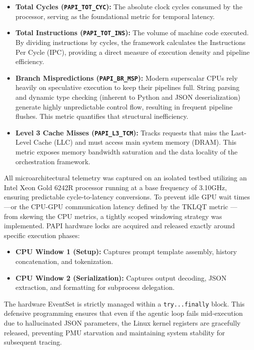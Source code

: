 \documentclass[10pt, letterpaper]{article}
\begin{document}
\begin{itemize}
\item \textbf{Total Cycles (\texttt{PAPI\_TOT\_CYC}):} The absolute clock cycles consumed by the processor, serving as the foundational metric for temporal latency.
\item \textbf{Total Instructions (\texttt{PAPI\_TOT\_INS}):} The volume of machine code executed. By dividing instructions by cycles, the framework calculates the Instructions Per Cycle (IPC), providing a direct measure of execution density and pipeline efficiency.
\item \textbf{Branch Mispredictions (\texttt{PAPI\_BR\_MSP}):} Modern superscalar CPUs rely heavily on speculative execution to keep their pipelines full. String parsing and dynamic type checking (inherent to Python and JSON deserialization) generate highly unpredictable control flow, resulting in frequent pipeline flushes. This metric quantifies that structural inefficiency.
\item \textbf{Level 3 Cache Misses (\texttt{PAPI\_L3\_TCM}):} Tracks requests that miss the Last-Level Cache (LLC) and must access main system memory (DRAM). This metric exposes memory bandwidth saturation and the data locality of the orchestration framework.
\end{itemize}

All microarchitectural telemetry was captured on an isolated testbed utilizing an Intel Xeon Gold 6242R processor running at a base frequency of 3.10GHz, ensuring predictable cycle-to-latency conversions. To prevent idle GPU wait times---or the CPU-GPU communication latency defined by the TKLQT metric \cite{coupled_architectures}---from skewing the CPU metrics, a tightly scoped windowing strategy was implemented. PAPI hardware locks are acquired and released exactly around specific execution phases:

\begin{itemize}
\item \textbf{CPU Window 1 (Setup):} Captures prompt template assembly, history concatenation, and tokenization.
\item \textbf{CPU Window 2 (Serialization):} Captures output decoding, JSON extraction, and formatting for subprocess delegation.
\end{itemize}

The hardware EventSet is strictly managed within a \texttt{try...finally} block. This defensive programming ensures that even if the agentic loop fails mid-execution due to hallucinated JSON parameters, the Linux kernel registers are gracefully released, preventing PMU starvation and maintaining system stability for subsequent tracing.
\end{document}
